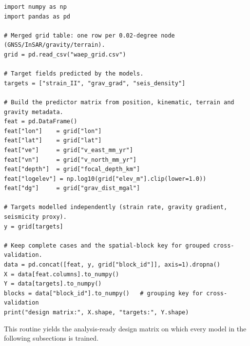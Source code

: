 \documentclass[pdflatex,sn-mathphys-num]{sn-jnl}%
\theoremstyle{thmstyleone}%
\theoremstyle{thmstyletwo}%
\theoremstyle{thmstylethree}%
\begin{document}
\begin{lstlisting}[style=py,caption={Core feature-engineering routine that assembles the predictor matrix and target vector from the merged open-access grid table.},label={lst:feat}]
import numpy as np
import pandas as pd

# Merged grid table: one row per 0.02-degree node (GNSS/InSAR/gravity/terrain).
grid = pd.read_csv("waep_grid.csv")

# Target fields predicted by the models.
targets = ["strain_II", "grav_grad", "seis_density"]

# Build the predictor matrix from position, kinematic, terrain and gravity metadata.
feat = pd.DataFrame()
feat["lon"]    = grid["lon"]
feat["lat"]    = grid["lat"]
feat["ve"]     = grid["v_east_mm_yr"]
feat["vn"]     = grid["v_north_mm_yr"]
feat["depth"]  = grid["focal_depth_km"]
feat["logelev"] = np.log10(grid["elev_m"].clip(lower=1.0))
feat["dg"]     = grid["grav_dist_mgal"]

# Targets modelled independently (strain rate, gravity gradient, seismicity proxy).
y = grid[targets]

# Keep complete cases and the spatial-block key for grouped cross-validation.
data = pd.concat([feat, y, grid["block_id"]], axis=1).dropna()
X = data[feat.columns].to_numpy()
Y = data[targets].to_numpy()
blocks = data["block_id"].to_numpy()   # grouping key for cross-validation
print("design matrix:", X.shape, "targets:", Y.shape)
\end{lstlisting}

This routine yields the analysis-ready design matrix on which every model in the
following subsections is trained.
\end{document}
